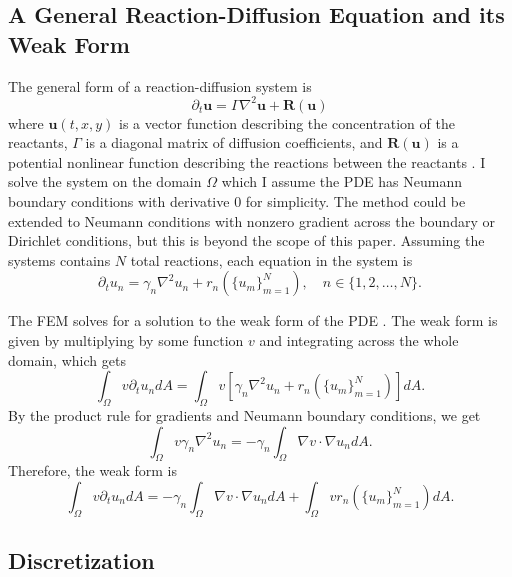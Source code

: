 \subsection{A General Reaction-Diffusion Equation and its Weak Form}

The general form of a reaction-diffusion system is
\[
    \partial_t \mathbf{u} = \Gamma \nabla^2 \mathbf{u} + \mathbf{R} (\mathbf{u})
\]
where $\mathbf{u}(t, x, y)$ is a vector function describing the concentration of the reactants, $\Gamma$ is a diagonal matrix of diffusion coefficients, and $\mathbf{R}(\mathbf{u})$ is a potential nonlinear function describing the reactions between the reactants \parencite{martin1992nonlinear}. I solve the system on the domain $\Omega$ which I assume the PDE has Neumann boundary conditions with derivative 0 for simplicity. The method could be extended to Neumann conditions with nonzero gradient across the boundary or Dirichlet conditions, but this is beyond the scope of this paper. Assuming the systems contains $N$ total reactions, each equation in the system is
\[
    \partial_t u_n = \gamma_n \nabla^2 u_n + r_n\left(\{u_m\}_{m = 1}^{N}\right), \quad n \in \{1, 2, \dots, N\}.
\]

The FEM solves for a solution to the weak form of the PDE \autocite{galerkin1968rods}. The weak form is given by multiplying by some function $v$ and integrating across the whole domain, which gets
\[
    \int_\Omega v \partial_t u_n dA = \int_\Omega v \left[ \gamma_n \nabla^2 u_n + r_n\left(\{u_m\}_{m = 1}^{N}\right)\right] dA.
\]
By the product rule for gradients and Neumann boundary conditions, we get
\[
    \int_\Omega v \gamma_n \nabla^2 u_n = -\gamma_n \int_\Omega \nabla v \cdot \nabla u_n dA.
\]
Therefore, the weak form is
\[
    \int_\Omega v \partial_t u_n dA = -\gamma_n \int_\Omega \nabla v \cdot \nabla u_n dA + \int_\Omega v r_n\left(\{u_m\}_{m = 1}^{N}\right) dA.
\]


\subsection{Discretization}

